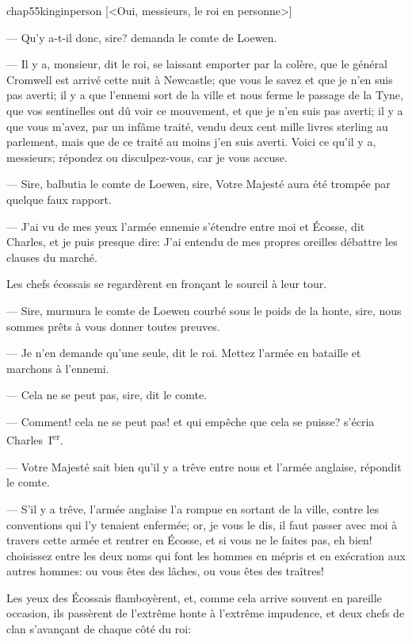 \begin{bwbigpic}
	[\basicscale] 
	{chap55kinginperson}
	[<Oui, messieurs, le roi en personne>]
\end{bwbigpic}

— Qu'y a-t-il donc, sire? demanda le comte de Loewen.

— Il y a, monsieur, dit le roi, se laissant emporter par la colère, que le général Cromwell est arrivé cette nuit à Newcastle; que vous le savez et que je n'en suis pas averti; il y a que l'ennemi sort de la ville et nous ferme le passage de la Tyne, que vos sentinelles ont dû voir ce mouvement, et que je n'en suis pas averti; il y a que vous m'avez, par un infâme traité, vendu deux cent mille livres sterling au parlement, mais que de ce traité au moins j'en suis averti. Voici ce qu'il y a, messieurs; répondez ou disculpez-vous, car je vous accuse.

— Sire, balbutia le comte de Loewen, sire, Votre Majesté aura été trompée par quelque faux rapport.

— J'ai vu de mes yeux l'armée ennemie s'étendre entre moi et Écosse, dit Charles, et je puis presque dire: J'ai entendu de mes propres oreilles débattre les clauses du marché.

Les chefs écossais se regardèrent en fronçant le sourcil à leur tour.

— Sire, murmura le comte de Loewen courbé sous le poids de la honte, sire, nous sommes prêts à vous donner toutes preuves.

— Je n'en demande qu'une seule, dit le roi. Mettez l'armée en bataille et marchons à l'ennemi.

— Cela ne se peut pas, sire, dit le comte.

— Comment! cela ne se peut pas! et qui empêche que cela se puisse? s'écria Charles~I\textsuperscript{er}.

— Votre Majesté sait bien qu'il y a trêve entre nous et l'armée anglaise, répondit le comte.

— S'il y a trêve, l'armée anglaise l'a rompue en sortant de la ville, contre les conventions qui l'y tenaient enfermée; or, je vous le dis, il faut passer avec moi à travers cette armée et rentrer en Écosse, et si vous ne le faites pas, eh bien! choisissez entre les deux noms qui font les hommes en mépris et en exécration aux autres hommes: ou vous êtes des lâches, ou vous êtes des traîtres!

Les yeux des Écossais flamboyèrent, et, comme cela arrive souvent en pareille occasion, ils passèrent de l'extrême honte à l'extrême impudence, et deux chefs de clan s'avançant de chaque côté du roi:

